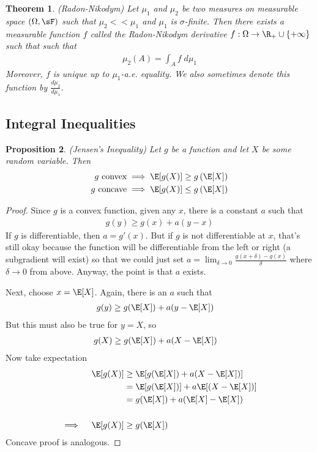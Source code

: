 \documentclass[12pt]{article}
\theoremstyle{plain}
\newtheorem{thm}{Theorem}[section]
\newtheorem{prop}[thm]{Proposition}
\theoremstyle{definition}
\theoremstyle{remark}
\newcommand{\ra}{\rightarrow}
\begin{document}
\begin{thm}(Radon-Nikodym)
Let $\mu_1$ and $\mu_2$ be two measures on measurable space
$(\Omega,\sF)$ such that $\mu_2<<\mu_1$ and $\mu_1$ is $\sigma$-finite.
Then there exists a measurable function $f$ called the
\emph{Radon-Nikodym derivative}
$f:\Omega\ra \R_+\cup \{+\infty\}$ such that
such that
\begin{align*}
  \mu_2(A) = \int_A f \; d\mu_1
\end{align*}
Moreover, $f$ is unique up to $\mu_1$-a.e. equality. We also sometimes
denote this function by $\frac{d\mu_2}{d\mu_1}$.
\end{thm}


\subsection{Integral Inequalities}

\begin{prop}{\emph{(Jensen's Inequality)}}
Let $g$ be a function and let $X$ be some random variable. Then
\begin{align*}
  \text{$g$ convex} &\implies \E[g(X)] \geq g\left(\E[X]\right) \\
  \text{$g$ concave} &\implies \E[g(X)] \leq g\left(\E[X]\right) \\
\end{align*}
\end{prop}
\begin{proof}
Since $g$ is a convex function, given any $x$, there is a constant $a$
such that
\begin{align*}
  g(y) \geq g(x) + a (y-x)
\end{align*}
If $g$ is differentiable, then $a=g'(x)$. But if $g$ is not
differentiable at $x$, that's still okay because the function will be
differentiable from the left or right (a subgradient will exist) so that
we could just set
$a=\lim_{\delta \ra 0} \frac{g(x+\delta)-g(x)}{\delta}$ where
$\delta\ra 0$ from above. Anyway, the point is that $a$ exists.

Next, choose $x=\E[X]$. Again, there is an $a$ such that
\begin{align*}
  g(y) &\geq g(\E[X]) + a (y-\E[X])
\end{align*}
But this must also be true for $y=X$, so
\begin{align*}
  g(X) &\geq g(\E[X]) + a (X-\E[X])
\end{align*}
Now take expectation
\begin{align*}
  \E[g(X)]
  &\geq \E[g(\E[X]) + a (X-\E[X])] \\
  &= \E[g(\E[X])] + a \E[(X-\E[X])] \\
  &= g(\E[X]) + a (\E[X]-\E[X]) \\\\
  \implies \quad
  \E[g(X)] &\geq g(\E[X])
\end{align*}
Concave proof is analogous.
\end{proof}
\end{document}

